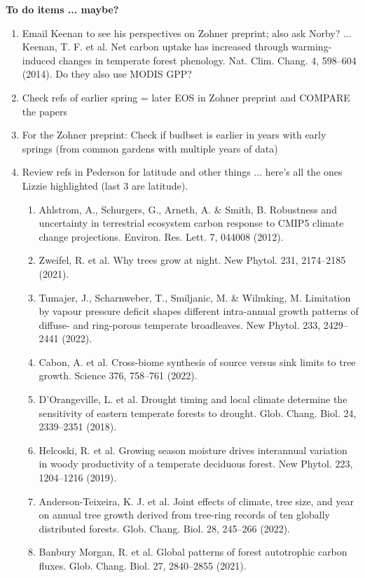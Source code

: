 \documentclass[11pt,letter]{article}
\begin{document}
{\bf To do items ... maybe?}
\begin{enumerate}
\item Email Keenan to see his perspectives on Zohner preprint; also ask Norby? %
 ... Keenan, T. F. et al. Net carbon uptake has increased through warming-induced changes in temperate forest phenology. Nat. Clim. Chang. 4, 598–604 (2014). Do they also use MODIS GPP?
\item Check refs of earlier spring = later EOS in Zohner preprint and COMPARE the papers
\item For the Zohner preprint: Check if budbset is earlier in years with early springs (from common gardens with multiple years of data)
\item Review refs in Pederson for latitude and other things ... here's all the ones Lizzie highlighted (last 3 are latitude).
\begin{enumerate}
\item Ahlstrom, A., Schurgers, G., Arneth, A. \& Smith, B. Robustness and uncertainty in terrestrial ecosystem carbon response to CMIP5 climate change projections. Environ. Res. Lett. 7, 044008 (2012).
\item Zweifel, R. et al. Why trees grow at night. New Phytol. 231, 2174–2185 (2021).
\item Tumajer, J., Scharnweber, T., Smiljanic, M. \& Wilmking, M. Limitation by vapour pressure
deficit shapes different intra-annual growth patterns of diffuse- and ring-porous
temperate broadleaves. New Phytol. 233, 2429–2441 (2022).
\item Cabon, A. et al. Cross-biome synthesis of source versus sink limits to tree growth.
Science 376, 758–761 (2022).
\item D'Orangeville, L. et al. Drought timing and local climate determine the sensitivity of
eastern temperate forests to drought. Glob. Chang. Biol. 24, 2339–2351 (2018).
\item Helcoski, R. et al. Growing season moisture drives interannual variation in woody productivity of a temperate deciduous forest. New Phytol. 223, 1204–1216 (2019).
\item Anderson-Teixeira, K. J. et al. Joint effects of climate, tree size, and year on annual tree growth derived from tree-ring records of ten globally distributed forests. Glob. Chang. Biol. 28, 245–266 (2022).
\item Banbury Morgan, R. et al. Global patterns of forest autotrophic carbon fluxes. Glob. Chang. Biol. 27, 2840–2855 (2021).

\end{enumerate}
\end{enumerate}
\end{document}
